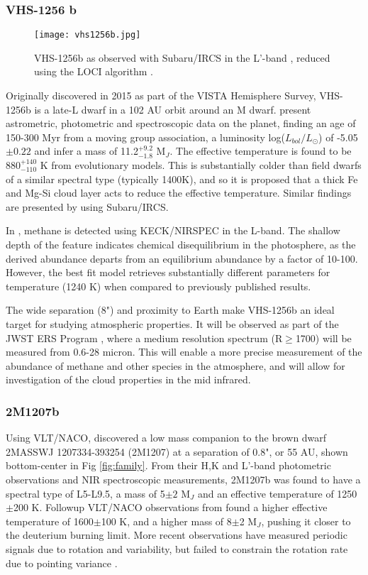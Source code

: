 \subsubsection{VHS-1256 b}
\begin{wrapfigure}{r}{5.5cm}
	\centering
	\texttt{[image: vhs1256b.jpg]}
	\caption{VHS-1256b as observed with Subaru/IRCS in the L'-band \parencite{Rich2016}, reduced using the LOCI algorithm \parencite{Galicher2011}.}
\end{wrapfigure}
Originally discovered in 2015 \parencite{Gauza2015} as part of the VISTA Hemisphere Survey, VHS-1256b is a late-L dwarf in a 102 AU orbit around an M dwarf.
\parencite{Gauza2015} present astrometric, photometric and spectroscopic data on the planet, finding an age of 150-300 Myr from a moving group association, a luminosity log($L_{bol}/L_{\odot}$) of -5.05$\pm0.22$ and infer a mass of 11.2$^{+9.2}_{-1.8}$ M$_{J}$. 
The effective temperature is found to be 880$^{+140}_{-110}$ K from evolutionary models. 
This is substantially colder than field dwarfs of a similar spectral type (typically 1400K), and so it is proposed that a thick Fe and Mg-Si cloud layer acts to reduce the effective temperature.
Similar findings are presented by \parencite{Rich2016} using Subaru/IRCS.

In \parencite{Miles2018}, methane is detected using KECK/NIRSPEC in the L-band. 
The shallow depth of the feature indicates chemical disequilibrium in the photosphere, as the derived abundance departs from an equilibrium abundance by a factor of 10-100.
However, the best fit model retrieves substantially different parameters for temperature (1240 K) when compared to previously published results.

The wide separation (8") and proximity to Earth make VHS-1256b an ideal target for studying atmospheric properties.
It will be observed as part of the JWST ERS Program \parencite{Hinkley2019}, where a medium resolution spectrum (R$\geq$1700) will be measured from 0.6-28 micron. 
This will enable a more precise measurement of the abundance of methane and other species in the atmosphere, and will allow for investigation of the cloud properties in the mid infrared.
\subsubsection{2M1207b}
Using VLT/NACO, \parencite{Chauvin2004} discovered a low mass companion to the brown dwarf 2MASSWJ 1207334-393254 (2M1207) at a separation of 0.8", or 55 AU, shown bottom-center in Fig \ref{fig:family}. 
From their H,K and L'-band photometric observations and NIR spectroscopic measurements, 2M1207b was found to have a spectral type of L5-L9.5, a mass of 5$\pm2$ M$_{J}$ and an effective temperature of 1250$\pm$200 K. Followup VLT/NACO observations from \parencite{Mohanty2007} found a higher effective temperature of 1600$\pm$100 K, and a higher mass of 8$\pm$2 M$_{J}$, pushing it closer to the deuterium burning limit. More recent observations have measured periodic signals due to rotation and variability, but failed to constrain the rotation rate due to pointing variance \parencite{Zhou2019}. 

